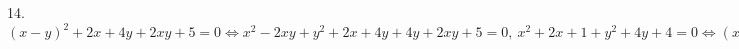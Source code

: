14. $(x-y)^2+2x+4y+2xy+5=0\Leftrightarrow x^2-2xy+y^2+2x+4y+4y+2xy+5=0,\ x^2+2x+1+y^2+4y+4=0\Leftrightarrow(x+1)^2+(y+2)^2=0\Leftrightarrow
x=-1,\ y=-2.$\\
